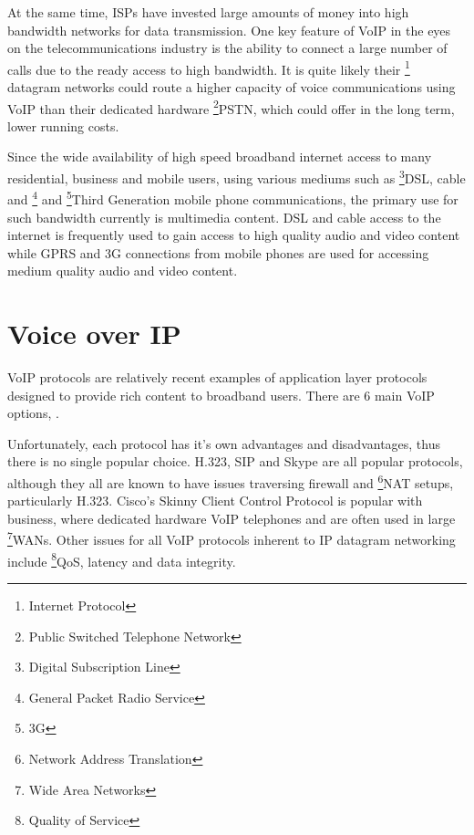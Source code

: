 \documentclass[a4paper,12pt]{article}
\begin{document}
At the same time, ISPs have invested large amounts of money into high
bandwidth networks for data transmission. One key feature of VoIP in the
eyes on the telecommunications industry is the ability to connect a
large number of calls due to the ready access to high bandwidth. It is
quite likely their \footnote{Internet Protocol} datagram networks could
route a higher capacity of voice communications using VoIP than their
dedicated hardware \footnote{Public Switched Telephone Network}{PSTN},
which could offer in the long term, lower running costs.


Since the wide availability of high speed broadband internet access to
many residential, business and mobile users, using various mediums such as
\footnote{Digital Subscription Line}{DSL}, cable and 
\footnote{General Packet Radio Service} and 
\footnote{3G}{Third Generation} mobile phone
communications, the primary use for such bandwidth currently is 
multimedia content. DSL and cable access to the internet is frequently
used to gain access to high quality audio and video content while GPRS
and 3G connections from mobile phones are used for accessing medium
quality audio and video content.

\section{Voice over IP}

VoIP protocols are relatively recent examples of application layer
protocols designed to provide rich content to broadband users. There are
6 main VoIP options, 
\cite[the \footnote{Internet Engineering Task Force}{IETF}'s 
\footnote{Session Initiation Protocol}{SIP},
the \footnote{International Telecommunications Union}{ITU}'s H.323,
Cisco's Skinny Client Control Protocol, The IETF and ITU's 
Megaco (aka H.348), MiNET, Skype and
\footnote{Inter-Asterisk eXchange}{IAX} ]{wikipedia-voip}.


Unfortunately, each protocol has it's own advantages and disadvantages,
thus there is no single popular choice. H.323, SIP and Skype are all
popular protocols, although they all are known to have issues 
traversing firewall and \footnote{Network Address Translation}{NAT} 
setups, particularly H.323. Cisco's Skinny Client Control Protocol is
popular with business, where dedicated hardware VoIP
telephones and are often used in large 
\footnote{Wide Area Networks}{WANs}. Other issues for all VoIP protocols inherent to IP datagram networking 
include \footnote{Quality of Service}{QoS}, latency and data integrity.
\end{document}
